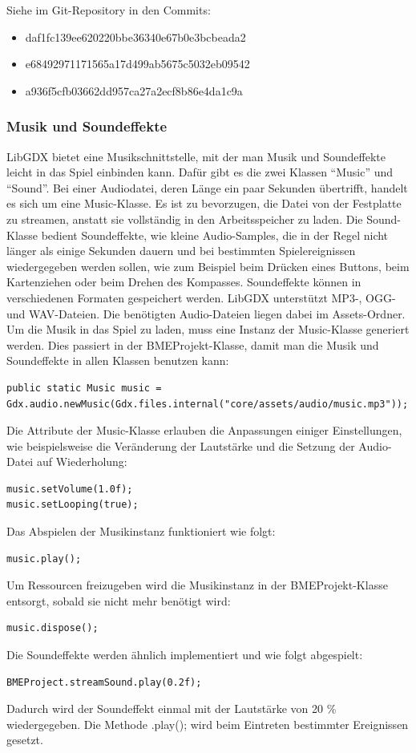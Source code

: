 Siehe im Git-Repository in den Commits:
\begin{itemize}
\item daf1fc139ee620220bbe36340e67b0e3bcbeada2
\item e68492971171565a17d499ab5675c5032eb09542
\item a936f5cfb03662dd957ca27a2ecf8b86e4da1c9a
\end{itemize}

\subsubsection{Musik und Soundeffekte}
LibGDX bietet eine Musikschnittstelle, mit der man Musik und Soundeffekte leicht in das Spiel einbinden kann. Dafür gibt es die zwei Klassen “Music” und “Sound”. Bei einer Audiodatei, deren Länge ein paar Sekunden übertrifft, handelt es sich um eine Music-Klasse.  Es ist zu bevorzugen, die Datei von der Festplatte zu streamen, anstatt sie vollständig in den Arbeitsspeicher zu laden. Die Sound-Klasse bedient Soundeffekte, wie kleine Audio-Samples, die in der Regel nicht länger als einige Sekunden dauern und bei bestimmten Spielereignissen wiedergegeben werden sollen, wie zum Beispiel beim Drücken eines Buttons, beim Kartenziehen oder beim Drehen des Kompasses. Soundeffekte können in verschiedenen Formaten gespeichert werden. LibGDX unterstützt MP3-, OGG- und WAV-Dateien. Die benötigten Audio-Dateien liegen dabei im Assets-Ordner.
Um die Musik in das Spiel zu laden, muss eine Instanz der Music-Klasse generiert werden. Dies passiert in der BMEProjekt-Klasse, damit man die Musik und Soundeffekte in allen Klassen benutzen kann:

\begin{lstlisting}[basicstyle=\tiny]
public static Music music = Gdx.audio.newMusic(Gdx.files.internal("core/assets/audio/music.mp3"));
\end{lstlisting}
Die Attribute der Music-Klasse erlauben die Anpassungen einiger Einstellungen, wie beispielsweise die Veränderung der Lautstärke und die Setzung der Audio-Datei auf Wiederholung:
\begin{lstlisting}
music.setVolume(1.0f);
music.setLooping(true);
\end{lstlisting}
Das Abspielen der Musikinstanz funktioniert wie folgt:
\begin{lstlisting}
music.play();
\end{lstlisting}
Um Ressourcen freizugeben wird die Musikinstanz in der BMEProjekt-Klasse entsorgt, sobald sie nicht mehr benötigt wird:
\begin{lstlisting}
music.dispose();
\end{lstlisting}
Die Soundeffekte werden ähnlich implementiert und wie folgt abgespielt: 
\begin{lstlisting}
BMEProject.streamSound.play(0.2f);
\end{lstlisting}
Dadurch wird der Soundeffekt einmal mit der Lautstärke von 20 \% wiedergegeben. Die Methode .play(); wird beim Eintreten bestimmter Ereignissen gesetzt.

